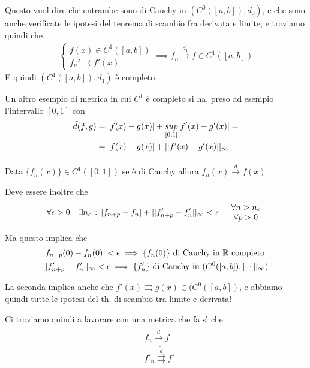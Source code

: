 Questo vuol dire che entrambe sono di Cauchy in $(C^0([a,b]),d_0)$, e che sono anche verificate le ipotesi del teorema di scambio fra derivata e limite, e troviamo quindi che
\begin{align}
	\left\{
	\begin{array}{cc}
		f(x)\in C^1([a,b]) \\
		f_n'\rightrightarrows f'(x)
	\end{array}
	\right. \implies f_n \overset{d_1}{\longrightarrow} f \in C^1([a,b])
\end{align}
E quindi $(C^1([a,b]),d_1)$ è completo.

Un altro esempio di metrica in cui $C^1$ è completo si ha, preso ad esempio l'intervallo $[0,1]$ con 
\begin{align}
	\tilde{d}(f,g) {}&= |f(x) - g(x)| + \underset{[0,1]}{sup}|f'(x) - g'(x)| = \nonumber \\
	&= |f(x) - g(x)| + ||f'(x) - g'(x)||_\infty
\end{align}

Data $\{f_n(x)\}\in C^1([0,1])$ se è di Cauchy allora $f_n(x) \overset{\tilde{d}}{\longrightarrow} f(x)$

Deve essere inoltre che
\begin{align}
	\forall \epsilon> 0 \quad \exists n_\epsilon \, : \, |f_{n+p} - f_n| + ||f_{n+p}' - f_n'||_\infty<\epsilon \quad  \begin{array}{cc}
		\forall n>n_\epsilon \\
		\forall p>0
	\end{array}
\end{align}

Ma questo implica che
\begin{align}
	{}&|f_{n+p}(0) - f_n(0)| < \epsilon \implies \{f_n(0)\} \text{ di Cauchy in } \mathbb{R} \text{ completo} \\
	& ||f_{n+p}' - f_n'||_\infty<\epsilon \implies \{f_n'\} \text{ di Cauchy in } (C^0([a,b]), ||\cdot||_\infty) 
\end{align}

La seconda implica anche che $f'(x) \rightrightarrows g(x) \in (C^0([a,b])$, e abbiamo quindi tutte le ipotesi del th. di scambio tra limite e derivata!

Ci troviamo quindi a lavorare con una metrica che fa sì che
\begin{align}
	{}&f_n \overset{\tilde{d}}{\longrightarrow} f\\
	& f'_n \overset{\tilde{d}}{\rightrightarrows} f'
\end{align}

